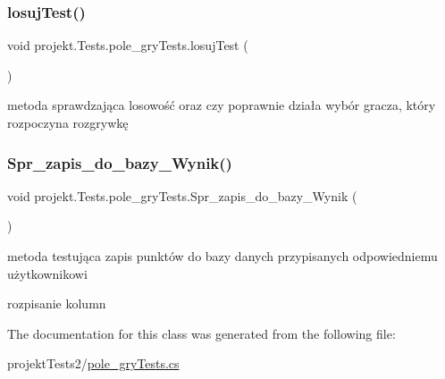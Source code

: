 \subsubsection{\texorpdfstring{losuj\+Test()}{losujTest()}}
{\footnotesize\ttfamily void projekt.\+Tests.\+pole\+\_\+gry\+Tests.\+losuj\+Test (\begin{DoxyParamCaption}{ }\end{DoxyParamCaption})\hspace{0.3cm}{\ttfamily [inline]}}



metoda sprawdzająca losowość oraz czy poprawnie działa wybór gracza, który rozpoczyna rozgrywkę 

\mbox{\label{classprojekt_1_1_tests_1_1pole__gry_tests_ad19d9a740af149c53c775875154982db}} 
\subsubsection{\texorpdfstring{Spr\+\_\+zapis\+\_\+do\+\_\+bazy\+\_\+\+Wynik()}{Spr\_zapis\_do\_bazy\_Wynik()}}
{\footnotesize\ttfamily void projekt.\+Tests.\+pole\+\_\+gry\+Tests.\+Spr\+\_\+zapis\+\_\+do\+\_\+bazy\+\_\+\+Wynik (\begin{DoxyParamCaption}{ }\end{DoxyParamCaption})\hspace{0.3cm}{\ttfamily [inline]}}



metoda testująca zapis punktów do bazy danych przypisanych odpowiedniemu użytkownikowi 

rozpisanie kolumn 

The documentation for this class was generated from the following file\+:\begin{DoxyCompactItemize}
\item 
projekt\+Tests2/\mbox{\hyperlink{pole__gry_tests_8cs}{pole\+\_\+gry\+Tests.\+cs}}\end{DoxyCompactItemize}
